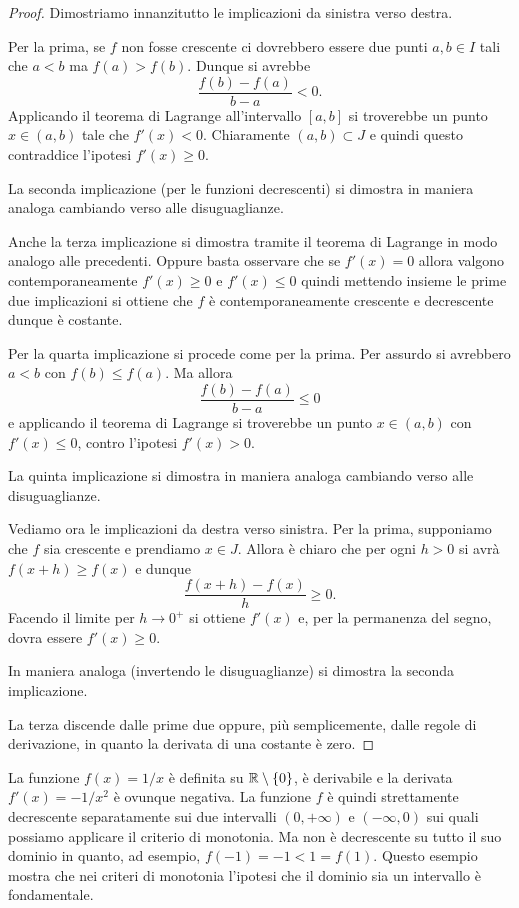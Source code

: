 \begin{proof}
\mymark{***}
Dimostriamo innanzitutto le implicazioni da sinistra verso destra.

Per la prima, se $f$ non fosse crescente ci dovrebbero essere due punti $a, b \in I$ tali che $a < b$ ma $f(a) > f(b)$.
Dunque si avrebbe
\[
  \frac{f(b) - f(a)}{b - a} < 0.
\]
Applicando il teorema di Lagrange all'intervallo $[a,b]$ si troverebbe un punto $x\in (a,b)$ tale che $f'(x) < 0$. Chiaramente $(a,b)\subset J$ e quindi questo contraddice l'ipotesi $f'(x) \ge 0$.

La seconda implicazione (per le funzioni decrescenti) si dimostra in maniera analoga cambiando verso alle disuguaglianze.

Anche la terza implicazione si dimostra tramite il teorema di Lagrange in modo analogo alle precedenti. Oppure basta osservare che se $f'(x)=0$ allora valgono contemporaneamente $f'(x)\ge 0$ e $f'(x)\le 0$ quindi mettendo insieme le prime due implicazioni si ottiene che $f$ è contemporaneamente crescente e decrescente dunque è costante.

Per la quarta implicazione si procede come per la prima. Per assurdo si  avrebbero $a<b$ con $f(b) \le f(a)$. Ma allora
\[
  \frac{f(b) - f(a)}{b-a} \le 0
\]
e applicando il teorema di Lagrange si troverebbe un punto $x\in (a,b)$ con $f'(x) \le 0$, contro l'ipotesi $f'(x) > 0$.

La quinta implicazione si dimostra in maniera analoga cambiando verso alle disuguaglianze.

Vediamo ora le implicazioni da destra verso sinistra.
Per la prima, supponiamo che $f$ sia crescente e prendiamo $x\in J$. Allora è chiaro che per ogni $h>0$ si avrà $f(x+h) \ge f(x)$ e dunque
\[
  \frac{f(x+h)- f(x)}{h} \ge 0.
\]
Facendo il limite per $h \to 0^+$ si ottiene $f'(x)$ e, per la permanenza del segno, dovra essere $f'(x) \ge 0$.

In maniera analoga (invertendo le disuguaglianze) si dimostra la seconda implicazione.

La terza discende dalle prime due oppure, più semplicemente, dalle regole di derivazione, in quanto la derivata di una costante è zero.
\end{proof}

\begin{example}
La funzione $f(x) = 1/x$ è definita su ${\mathbb R} \setminus {\left\{ 0 \right\}}$, è derivabile
e la derivata $f'(x) = -1/x^2$ è ovunque negativa. La funzione $f$ è quindi strettamente
decrescente separatamente sui due intervalli $(0,+\infty)$ e $(-\infty,0)$ sui quali
possiamo applicare il criterio di monotonia. Ma non è
decrescente su tutto il suo dominio in quanto, ad esempio, $f(-1) = -1 < 1 = f(1)$.
Questo esempio mostra che nei criteri di monotonia l'ipotesi che il dominio sia un intervallo
è fondamentale.
\end{example}

